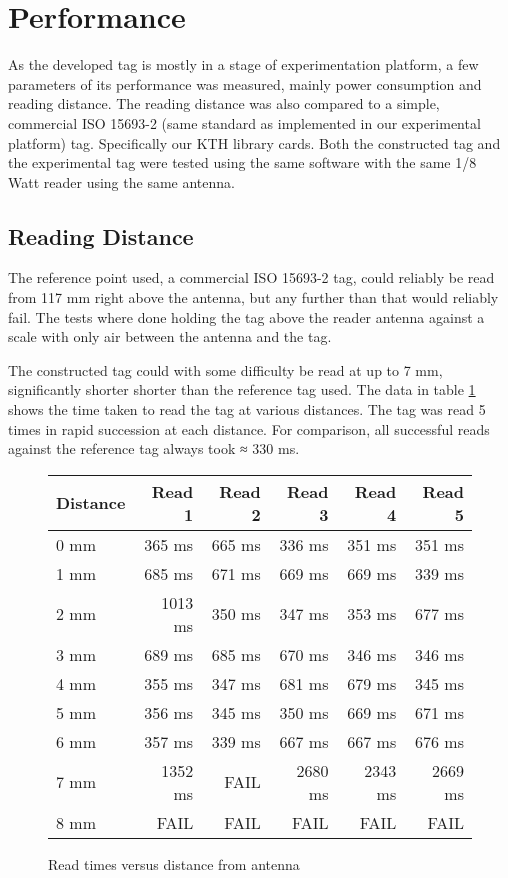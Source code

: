 \section{Performance}

As the developed tag is mostly in a stage of experimentation platform, a few parameters of its performance
was measured, mainly power consumption and reading distance. The reading distance was also compared to a
simple, commercial ISO 15693-2 (same standard as implemented in our experimental platform) tag. Specifically our
KTH library cards. Both the constructed tag and the experimental tag were tested using the same software with
the same 1/8 Watt reader using the same antenna.

\subsection{Reading Distance}
The reference point used, a commercial ISO 15693-2 tag, could reliably be read from 117 mm right above the
antenna, but any further than that would reliably fail. The tests where done holding the tag above the reader
antenna against a scale with only air between the antenna and the tag.

The constructed tag could with some difficulty be read at up to 7 mm, significantly shorter shorter than
the reference tag used. The data in table \ref{tab:readdistance} shows the time taken to read the tag at various distances.
The tag was read 5 times in rapid succession at each distance. For comparison, all successful reads against
the reference tag always took ≈ 330 ms.

\begin{figure}
\centering
\label{tab:readdistance}
\begin{tabular}{| l | r | r | r | r | r |}
	\hline
	Distance & Read 1 & Read 2 & Read 3 & Read 4 & Read 5 \\ \hline
	0 mm & 365 ms & 665 ms & 336 ms & 351 ms & 351 ms \\ \hline
	1 mm & 685 ms & 671 ms & 669 ms & 669 ms & 339 ms \\ \hline
	2 mm & 1013 ms & 350 ms & 347 ms & 353 ms & 677 ms \\ \hline
	3 mm & 689 ms & 685 ms & 670 ms & 346 ms & 346 ms \\ \hline
	4 mm & 355 ms & 347 ms & 681 ms & 679 ms & 345 ms \\ \hline
	5 mm & 356 ms & 345 ms & 350 ms & 669 ms & 671 ms \\ \hline
	6 mm & 357 ms & 339 ms & 667 ms & 667 ms & 676 ms \\ \hline
	7 mm & 1352 ms & FAIL & 2680 ms & 2343 ms & 2669 ms \\ \hline
	8 mm & FAIL & FAIL & FAIL & FAIL & FAIL \\ \hline
\end{tabular}
\caption{Read times versus distance from antenna}
\end{figure}

